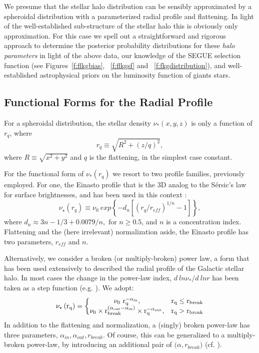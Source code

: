 \documentclass[12pt,preprint]{aastex}
\begin{document}
We presume that the stellar halo distribution can be sensibly approximated by a spheroidal distribution with a parameterized radial profile and flattening. In light of the well-established sub-structure of the stellar halo 
\citep[cf.][]{Belokurov2006, Bell2008} this is obviously only approximation. 
For this case we spell out a straightforward and rigorous approach to determine the posterior probability distributions for these \textit{halo parameters} in light of the above data, our knowledge of the SEGUE selection function (see Figures~\ref{f:flkgbias}, ~\ref{f:flkgsf} and ~\ref{f:fkgdistribution}), and well-established astrophysical priors on the luminosity function of giants stars. 

\subsection{Functional Forms for the Radial Profile}\label{sec:RadialProfileFunctions}

For a spheroidal distribution, the stellar density $\nu_*(x,y,z)$ is only a function of $r_q$,
where 
\begin{equation}
r_q\equiv \sqrt{R^2 + (z/q)^2},
\end{equation}
where $R\equiv \sqrt{x^2+y^2}$ and $q$ is the flattening, in the simplest case constant.

For the functional form of $\nu_*(r_q)$ we resort to two profile families, previously employed.
For one, the Einasto profile \citep{Einasto1989} that is the 3D analog to the S{\'e}rsic's law\citep{Sersic1963} for surface brightnesses, and has been used in this context \citep{Sesar2011,Deason2011,Merritt2006} :
\begin{equation}
\nu_{\star}(r_q) \equiv \nu_0~exp\left\{-d_n\left[\left(r_q/r_{eff}\right )^{1/n}-1\right ]\right\},
\end{equation}
where $ d_n \approx 3n-1/3+0.0079/n, \mbox{ for } n \ge 0.5 \nonumber$,
and $n$ is a concentration index. Flattening and the (here irrelevant) normalization aside, the Einasto profile has two parameters, $r_{eff}$ and $n$.

Alternatively, we consider a broken (or multiply-broken) power law, a form that has been used extensively to described the radial profile of the Galactic stellar halo\citep{Saha1985,Sesar2011,Deason2011,Deason2014}. In most cases the change in the power-law index, 
$d~ln\nu_*/d~ln r$ has been taken as a step function (e.g. \citet{Deason2011}). We adopt:
\begin{equation}
\rm \nu_\star\left(r_q \right )= \left\{\begin{matrix} \rm \nu_0~r_q^{-\alpha_{in}}, & \rm r_q\leq r_{break} \\ \rm \nu_0\times r_{break}^{(\alpha_{out}-\alpha_{in})}\times r_q^{-\alpha_{out}},&\rm r_q>r_{break} \end{matrix}\right.
\end{equation}
In addition to the flattening and normalization, a (singly) broken power-law has three parameters,
$\alpha_{in}, \alpha_{out}, r_{break}$. Of course, this can be generalized to a multiply-broken
power-law, by introducing an additional pair of $\bigl ( \alpha, r_{break} \bigr )$ (cf. \citet{Deason2014}).
\end{document}
